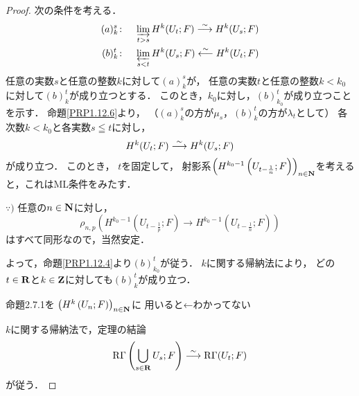 \begin{proof}
    次の条件を考える．
    \begin{align*}
        (a)_k^s\colon\quad \indlim[t>s]H^k(U_t;F)\simar H^k(U_s;F)\\
        (b)_k^t\colon\quad \prolim[s<t]H^k(U_s;F)\simra H^k(U_t;F)        
    \end{align*}
    任意の実数\(s\)と任意の整数\(k\)に対して\((a)_k^s\)が，
    任意の実数\(t\)と任意の整数\(k<k_0\)に対して\((b)_k^t\)が成り立つとする．
    このとき，\(k_0\)に対し，\((b)_{k_0}^t\)が成り立つことを示す．
    命題\ref{PRP1.12.6}より，
    （\((a)_k^s\)の方が\(\mu_s\)，\((b)_k^t\)の方が\(\lambda_t\)として）
    各次数\(k<k_0\)と各実数\(s\leqq t\)に対し，
    \begin{equation}
        H^k(U_t;F)\simar H^k(U_s;F)
    \end{equation}
    が成り立つ．
    このとき，
    \(t\)を固定して，
    射影系\(\left(
        H^{k_0-1}\left(U_{t-\frac{1}{n}};F\right)
    \right)_{n\in\nn}\)を考えると，これはML条件をみたす．
    \begin{center}
        \begin{minipage}{.9\textwidth}
            \begin{redleftbar}
                \(\because)\) 
                任意の\(n\in\nn\)に対し，
                \[
                    \rho_{n,p}
                    \left(
                        H^{k_0-1}\left(U_{t-\frac{1}{p}};F\right)
                        \to 
                        H^{k_0-1}\left(U_{t-\frac{1}{n}};F\right)
                    \right)
                \]
                はすべて同形なので，当然安定．
            \end{redleftbar}
        \end{minipage}
     \end{center}        
    よって，命題\ref{PRP1.12.4}より\((b)_{k_0}^t\)が従う．
    \(k\)に関する帰納法により，
    どの\(t\in\rr\)と\(k\in\zz\)に対しても\((b)_{k}^t\)が成り立つ．
    \begin{center}
        命題2.7.1を
        \(\left(H^{k}\left(U_{n};F\right)\right)_{n\in\nn}\)に
        用いると←わかってない
    \end{center}
    \(k\)に関する帰納法で，定理の結論
    \[
        \RG\left(\bigcup_{s\in\rr}U_s;F\right)\overset{\sim}{\longrightarrow}\RG(U_t;F)
    \]
    が従う．


\end{proof}
